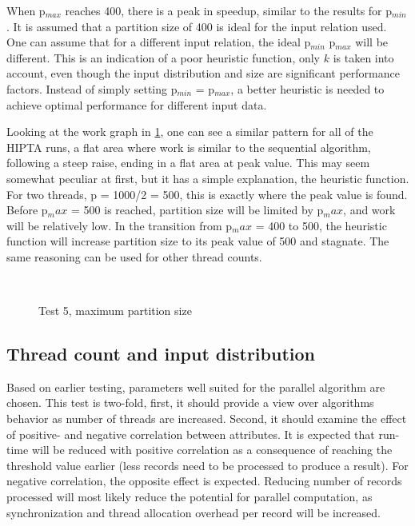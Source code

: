 When p$_{max}$ reaches 400, there is a peak in speedup, similar to the
results for p$_{min}$. It is assumed that a partition size of 400 is
ideal for the input relation used. One can assume that for a different
input relation, the ideal p$_{min}$ p$_{max}$ will be different. This
is an indication of a poor heuristic function, only $k$ is taken into
account, even though the input distribution and size are significant
performance factors.  Instead of simply setting p$_{min}$ = p$_{max}$,
a better heuristic is needed to achieve optimal performance for
different input data.

Looking at the work graph in \ref{fig:test5}, one can see a similar
pattern for all of the HIPTA runs, a flat area where work is similar
to the sequential algorithm, following a steep raise, ending in a flat
area at peak value. This may seem somewhat peculiar at first, but it
has a simple explanation, the heuristic function. For two threads, p =
1000/2 = 500, this is exactly where the peak value is found. Before
p${_max}$ = 500 is reached, partition size will be limited by
p${_max}$, and work will be relatively low. In the transition from
p${_max}$ = 400 to 500, the heuristic function will increase partition
size to its peak value of 500 and stagnate. The same reasoning can be
used for other thread counts.

\begin{figure}[H]
	\centering
	 \qquad
	 \\
	 \qquad
	\caption{Test 5, maximum partition size}
	\label{fig:test5}
\end{figure}

\subsection{Thread count and input distribution}

Based on earlier testing, parameters well suited for the parallel
algorithm are chosen. This test is two-fold, first, it should provide
a view over algorithms behavior as number of threads are increased.
Second, it should examine the effect of positive- and negative
correlation between attributes. It is expected that run-time will be
reduced with positive correlation as a consequence of reaching the
threshold value earlier (less records need to be processed to produce
a result). For negative correlation, the opposite effect is expected.
Reducing number of records processed will most likely reduce the
potential for parallel computation, as synchronization and thread
allocation overhead per record will be increased.

